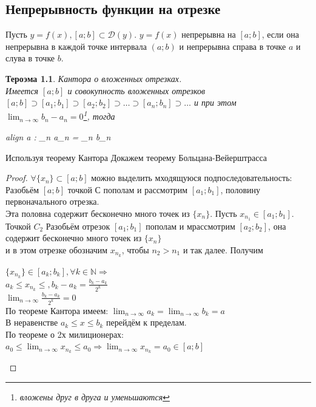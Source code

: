 \documentclass[oneside]{book}
\newcommand{\boxedeq}[2]{\begin{empheq}[box={\fboxsep=6pt\fbox}]{align}\label{#1}#2\end{empheq}}
\newtheorem{thm}{Тероэма}[chapter] %
\begin{document}
\begin{enumerate}
\chapter{Непрерывность функции на отрезке}
Пусть $y = f(x), [a;b] \subset \mathcal{D}(y)$. $y = f(x)$ непрерывна на $[a;b]$, если она непрерывна в каждой точке интервала $(a;b)$ и
непрерывна справа в точке $a$ и слува в точке $b$.
\begin{thm}
    Кантора о вложенных отрезках. \\
    Имеется $[a;b]$ и совокупность вложенных отрезков $[a;b] \supset [a_1;b_1] \supset [a_2;b_2] \supset \dots \supset [a_n; b_n]
    \supset \dots$ и при этом $\lim_{n \rightarrow \infty}{b_n - a_n} = 0$\footnote{вложены друг в друга и уменьшаются}, тогда
    \boxedeq{eq:*}{
        \exists a \in [a; b] : \lim_{n \rightarrow \infty}{a_n} = \lim_{n \rightarrow \infty}{b_n}
    }
\end{thm}
Используя теорему Кантора Докажем теорему Больцана-Вейерштрасса
\begin{proof}
    $\forall \{x_n\} \subset [a; b]$ можно выделить мходящуюся подпоследовательность:\\
    Разобьём $[a; b]$ точкой С пополам и рассмотрим $[a_1; b_1]$, половину первоначального отрезка.\\
    Эта половна содержит бесконечно много точек из $\{x_n\}$. Пусть $x_{n_1} \in [a_1; b_1]$. \\
    Точкой $C_2$ Разобьём отрезок $[a_1; b_1]$ пополам и мрассмотрим $[a_2; b_2]$, она содержит бесконечно много точек из $\{x_n\}$ \\
    и в этом отрезке обозначим $x_{n_k}$, чтобы $n_2 > n_1$ и так далее. Получим \\
    \begin{center}
        $\{x_{n_k}\} \in [a_k; b_k], \forall k \in \mathbb{N} \Rightarrow$ \\
        $a_k \leq x_{n_k} \leq, b_k - a_k = \frac{b_k - a_k}{2^k}$ \\
        $\lim_{n \rightarrow \infty}{\frac{b_k - a_k}{2^k} = 0}$ \\
        По теореме Кантора имеем: $\lim_{n \rightarrow \infty}{a_k} = \lim_{n \rightarrow \infty}{b_k} = a$\\
        В неравенстве $a_k \leq x \leq b_k$ перейдём к пределам.\\
        По теореме о 2х милиционерах:\\
        $a_0 \leq \lim_{n \rightarrow \infty}{x_{n_k}} \leq a_0 \Rightarrow \lim_{n \rightarrow \infty}{x_{n_k}} = a_0 \in [a; b]$

\end{center}
\end{proof}
\end{enumerate}
\end{document}
